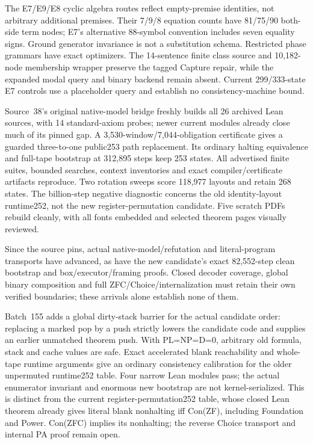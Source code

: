 \documentclass[11pt]{article}
\begin{document}
{The E7/E9/E8 cyclic algebra routes reflect empty-premise identities, not arbitrary
additional premises. Their 7/9/8 equation counts have 81/75/90 both-side term
nodes; E7's alternative 88-symbol convention includes seven equality signs.
Ground generator invariance is not a substitution schema. Restricted phase
grammars have exact optimizers. The 14-sentence finite class source and
10,182-node membership wrapper preserve the tagged Capture repair, while the
expanded modal query and binary backend remain absent. Current 299/333-state
E7 controls use a placeholder query and establish no consistency-machine bound.

Source~38's original native-model bridge freshly builds all 26 archived Lean
sources, with 14 standard-axiom probes; newer current modules already close much
of its pinned gap. A 3,530-window/7,044-obligation certificate gives a guarded
three-to-one public253 path replacement. Its ordinary halting equivalence and
full-tape bootstrap at 312,895 steps keep 253 states. All advertised finite suites,
bounded searches, context inventories and exact compiler/certificate artifacts
reproduce. Two rotation sweeps score 118,977 layouts and retain 268 states.
The billion-step negative diagnostic concerns the old identity-layout runtime252,
not the new register-permutation candidate. Five scratch PDFs rebuild cleanly,
with all fonts embedded and selected theorem pages visually reviewed.

Since the source pins, actual native-model/refutation and literal-program
transports have advanced, as have the new candidate's exact 82,552-step clean
bootstrap and box/executor/framing proofs. Closed decoder coverage, global binary
composition and full ZFC/Choice/internalization must retain their own verified
boundaries; these arrivals alone establish none of them.

Batch~155 adds a global dirty-stack barrier for the actual candidate order:
replacing a marked pop by a push strictly lowers the candidate code and supplies
an earlier unmatched theorem push. With PL=NP=D=0, arbitrary old formula,
stack and cache values are safe. Exact accelerated blank reachability and
whole-tape runtime arguments give an ordinary consistency calibration for the
older unpermuted runtime252 table. Four narrow Lean modules pass; the actual
enumerator invariant and enormous new bootstrap are not kernel-serialized.
This is distinct from the current register-permutation252 table, whose closed
Lean theorem already gives literal blank nonhalting iff Con(ZF), including
Foundation and Power. Con(ZFC) implies its nonhalting; the reverse Choice
transport and internal PA proof remain open.

}
\end{document}
